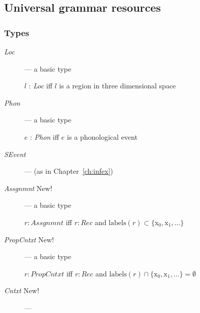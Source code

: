 \subsection{Universal grammar resources} 

\subsubsection{Types} 

\begin{description}

  \item[\textnormal{\textit{Loc}}] --- a basic type

  $l$ : \textit{Loc} iff $l$ is a region in three dimensional space

  
\item[\textnormal{\textit{Phon}}] --- a basic type

  $e$ : \textit{Phon} iff $e$ is a phonological event
  
\item[\textnormal{\textit{SEvent}}] ---  (as in
      Chapter~\ref{ch:infex})

      
    \item[\textnormal{\textit{Assgnmnt}} New!] --- a basic type

      $r:\textit{Assgnmnt}$ iff
$r:\textit{Rec}$ and
$\mathrm{labels}(r)\subset\{\text{x}_0,\text{x}_1,\ldots\}$

\item[\textnormal{\textit{PropCntxt}} New!] --- a basic type

  $r:\textit{PropCntxt}$ iff
$r:\textit{Rec}$ and
$\mathrm{labels}(r)\cap\{\text{x}_0,\text{x}_1,\ldots\}=\emptyset$

\item[\textnormal{\textit{Cntxt}} New!] --- 


\end{description}
